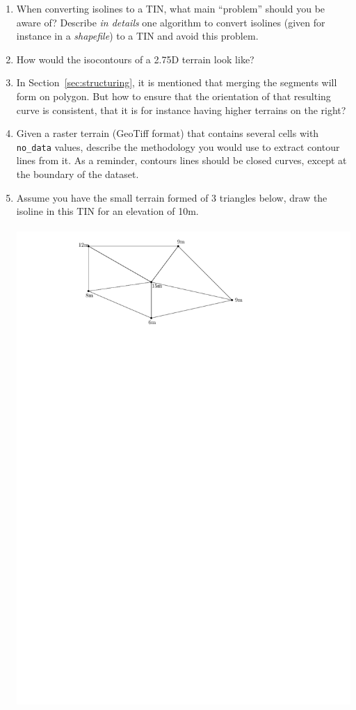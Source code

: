 \begin{enumerate}
  \item When converting isolines to a TIN, what main ``problem'' should you be aware of? Describe \emph{in details} one algorithm to convert isolines (given for instance in a \emph{shapefile}) to a TIN and avoid this problem.
  \item How would the isocontours of a 2.75D terrain look like?
  \item In Section~\ref{sec:structuring}, it is mentioned that merging the segments will form on polygon. But how to ensure that the orientation of that resulting curve is consistent, that it is for instance having higher terrains on the right?
  \item Given a raster terrain (GeoTiff format) that contains several cells with \texttt{no\_data} values, describe the methodology you would use to extract contour lines from it. As a reminder, contours lines should be closed curves, except at the boundary of the dataset.
  \item Assume you have the small terrain formed of 3 triangles below, draw the isoline in this TIN for an elevation of 10m.
  \\ \\
  \includegraphics[width=0.5\linewidth]{figs/threetr.pdf}
\end{enumerate}